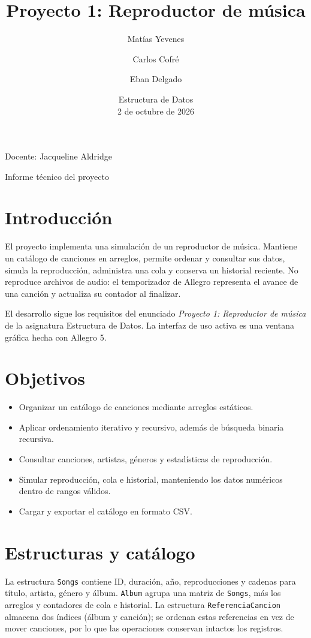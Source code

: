 \documentclass[11pt,a4paper]{article}
\title{Proyecto 1: Reproductor de música}
\author{Matías Yevenes \and Carlos Cofré \and Eban Delgado}
\date{Estructura de Datos \\ 2 de octubre de 2026}
\begin{document}
\maketitle
\thispagestyle{empty}

\begin{center}
Docente: Jacqueline Aldridge\\
\end{center}
\vfill
\begin{center}
Informe técnico del proyecto
\end{center}
\newpage
\tableofcontents
\newpage

\section{Introducción}
El proyecto implementa una simulación de un reproductor de música. Mantiene un catálogo de canciones en arreglos, permite ordenar y consultar sus datos, simula la reproducción, administra una cola y conserva un historial reciente. No reproduce archivos de audio: el temporizador de Allegro representa el avance de una canción y actualiza su contador al finalizar.

El desarrollo sigue los requisitos del enunciado \textit{Proyecto 1: Reproductor de música} de la asignatura Estructura de Datos. La interfaz de uso activa es una ventana gráfica hecha con Allegro 5.

\section{Objetivos}
\begin{itemize}
  \item Organizar un catálogo de canciones mediante arreglos estáticos.
  \item Aplicar ordenamiento iterativo y recursivo, además de búsqueda binaria recursiva.
  \item Consultar canciones, artistas, géneros y estadísticas de reproducción.
  \item Simular reproducción, cola e historial, manteniendo los datos numéricos dentro de rangos válidos.
  \item Cargar y exportar el catálogo en formato CSV.
\end{itemize}

\section{Estructuras y catálogo}
La estructura \texttt{Songs} contiene ID, duración, año, reproducciones y cadenas para título, artista, género y álbum. \texttt{Album} agrupa una matriz de \texttt{Songs}, más los arreglos y contadores de cola e historial. La estructura \texttt{ReferenciaCancion} almacena dos índices (álbum y canción); se ordenan estas referencias en vez de mover canciones, por lo que las operaciones conservan intactos los registros.
\end{document}
